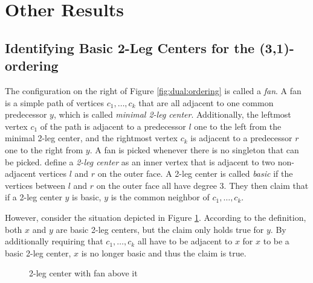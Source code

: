 \documentclass[a4paper]{article}
\begin{document}
\section{Other Results}\label{sec:other}
\subsection{Identifying Basic 2-Leg Centers for the (3,1)-ordering}
The configuration on the right of Figure \ref{fig:dual:ordering} is called a
\emph{fan}.
A fan is a simple path of vertices $c_1, \dots, c_k$ that are all adjacent to one
common predecessor $y$, which is called \emph{minimal 2-leg center}.
Additionally, the leftmost vertex $c_1$ of the path is adjacent to a predecessor
$l$ one to the left from the minimal 2-leg center, and the rightmost vertex
$c_k$ is adjacent to a predecessor $r$ one to the right from $y$.
A fan is picked whenever there is no singleton that can be picked.
\citet{dual} define a \emph{2-leg center} as an inner vertex that is adjacent to
two non-adjacent vertices $l$ and $r$ on the outer face.
A 2-leg center is called \emph{basic} if the vertices between $l$ and $r$
on the outer face all have degree 3.
They then claim that if a 2-leg center $y$ is basic, $y$ is the common
neighbor of $c_1, \dots, c_k$.

However, consider the situation depicted in Figure \ref{fig:fan}.
According to the definition, both $x$ and $y$ are basic 2-leg centers, but the
claim only holds true for $y$.
By additionally requiring that $c_1, \dots, c_k$ all have to be adjacent to $x$
for $x$ to be a basic 2-leg center, $x$ is no longer basic and thus the claim is
true.

\begin{figure}[ht]
    \center
    \caption{2-leg center with fan above it}
    \label{fig:fan}
\end{figure}
\end{document}
